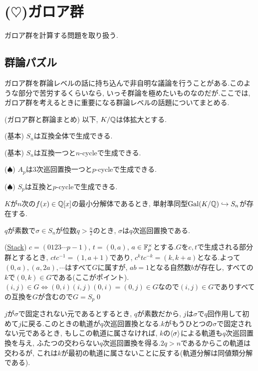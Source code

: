 \section{($\heartsuit$)ガロア群}
ガロア群を計算する問題を取り扱う.
\subsection{群論パズル}
ガロア群を群論レベルの話に持ち込んで非自明な議論を行うことがある.このような部分で苦労するくらいなら, いっそ群論を極めたいものなのだが.ここでは, ガロア群を考えるときに重要になる群論レベルの話題についてまとめる.
\begin{prop} (ガロア群と群論まとめ)
以下, $K/\mathbb{Q}$は体拡大とする.
\ben
\item (基本) $S_n$は互換全体で生成できる.
\item (基本) $S_n$は互換一つと$n$-cycleで生成できる.
\item ($\spadesuit$) $A_p$は$3$次巡回置換一つと$p$-cycleで生成できる.
\item ($\spadesuit$) $S_{p}$は互換と$p$-cycleで生成できる.
\item $K$が$n$次の$f(x)\in \mathbb{Q}[x]$の最小分解体であるとき, 単射準同型$\operatorname{Gal}(K/\mathbb{Q})\hookrightarrow S_{n}$が存在する.
\item $q$が素数で$\sigma\in S_n$が位数$q > \frac{n}{2}$のとき, $\sigma$は$q$次巡回置換である.
\een
\end{prop}
\prf
\ben
\item
\item
\item
\item (\href{https://math.stackexchange.com/questions/2792165/let-a-be-a-p-cycle-in-s-p-and-let-b-be-a-transposition-in-s-p-show-s/2792188}{Stack}) $c= (0123\cdots p-1)$, $t=(0,a)$, $a\in \mathbb{F}_{p}^{\times}$とする.$G$を$c,t$で生成される部分群とするとき, $ctc^{-1} = (1,a+1)$であり, $c^{k} t c^{-k} = (k,k+a)$となる.よって$(0,a),(a,2a),\cdots$はすべて$G$に属すが, $ab = 1$となる自然数$b$が存在し, すべての$k$で$(0,k)\in G$である(ここがポイント).$(i,j)\in G \iff (0,i)(i,j)(0,i)=(0,j)\in G$なので$(i,j)\in G$でありすべての互換を$G$が含むので$G=S_p$\qed
\item $j$が$\sigma$で固定されない元であるとするとき, $q$が素数だから, $j$は$\sigma$で$q$回作用して初めて$j$に戻る.このときの軌道が$q$次巡回置換となる.$k$がもうひとつの$\sigma$で固定されない元であるとき, もしこの軌道に属さなければ, $k$の$\langle \sigma \rangle$による軌道も$q$次巡回置換を与え, ふたつの交わらない$q$次巡回置換を得る.$2q>n$であるからこの軌道は交わるが, これは$k$が最初の軌道に属さないことに反する(軌道分解は同値類分解である).
\een

